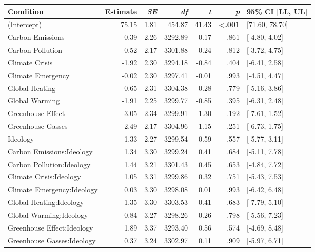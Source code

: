 \begin{table}[ht]
\centering
\begin{tabular}{lrrrrrl}
  \hline
Condition & Estimate & \textit{SE} & \textit{df} & \textit{t} & \textit{p} & 95\% CI [LL, UL] \\ 
  \hline
(Intercept) & 75.15 & 1.81 & 454.87 & 41.43 & \textbf{\textless  .001} & [71.60, 78.70] \\ 
  Carbon Emissions & -0.39 & 2.26 & 3292.89 & -0.17 & .861 & [-4.80, 4.02] \\ 
  Carbon Pollution & 0.52 & 2.17 & 3301.88 & 0.24 & .812 & [-3.72, 4.75] \\ 
  Climate Crisis & -1.92 & 2.30 & 3294.18 & -0.84 & .404 & [-6.41, 2.58] \\ 
  Climate Emergency & -0.02 & 2.30 & 3297.41 & -0.01 & .993 & [-4.51, 4.47] \\ 
  Global Heating & -0.65 & 2.31 & 3304.38 & -0.28 & .779 & [-5.16, 3.86] \\ 
  Global Warming & -1.91 & 2.25 & 3299.77 & -0.85 & .395 & [-6.31, 2.48] \\ 
  Greenhouse Effect & -3.05 & 2.34 & 3299.91 & -1.30 & .192 & [-7.61, 1.52] \\ 
  Greenhouse Gasses & -2.49 & 2.17 & 3304.96 & -1.15 & .251 & [-6.73, 1.75] \\ 
  Ideology & -1.33 & 2.27 & 3299.54 & -0.59 & .557 & [-5.77, 3.11] \\ 
  Carbon Emissions:Ideology & 1.34 & 3.30 & 3299.24 & 0.41 & .684 & [-5.11, 7.78] \\ 
  Carbon Pollution:Ideology & 1.44 & 3.21 & 3301.43 & 0.45 & .653 & [-4.84, 7.72] \\ 
  Climate Crisis:Ideology & 1.05 & 3.31 & 3299.86 & 0.32 & .751 & [-5.43, 7.53] \\ 
  Climate Emergency:Ideology & 0.03 & 3.30 & 3298.08 & 0.01 & .993 & [-6.42, 6.48] \\ 
  Global Heating:Ideology & -1.35 & 3.30 & 3303.53 & -0.41 & .683 & [-7.79, 5.10] \\ 
  Global Warming:Ideology & 0.84 & 3.27 & 3298.26 & 0.26 & .798 & [-5.56, 7.23] \\ 
  Greenhouse Effect:Ideology & 1.89 & 3.37 & 3293.40 & 0.56 & .574 & [-4.69, 8.48] \\ 
  Greenhouse Gasses:Ideology & 0.37 & 3.24 & 3302.97 & 0.11 & .909 & [-5.97, 6.71] \\ 
   \hline
\end{tabular}
\end{table}
